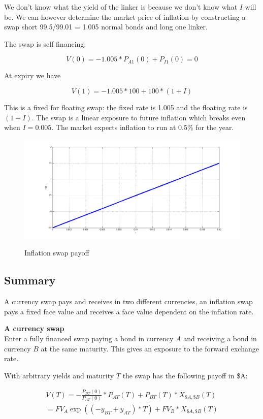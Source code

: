 We don't know what the yield of the linker is because we don't know what $I$ will be. We can however determine the market price of inflation by constructing a swap short 99.5/99.01 = 1.005 normal bonds and long one linker. 

The swap is self financing:

\[ V(0) = -1.005*P_{A1}(0) + P_{I1}(0) = 0\]

At expiry we have

\[ V(1) =  -1.005*100 + 100*(1+I)\]

This is a fixed for floating swap: the fixed rate is 1.005 and the floating rate is $(1+I)$. The swap is  a linear exposure to future inflation which breaks even when $I=0.005$. The market expects inflation to run at 0.5\% for the year. 

\begin{figure}[ht]
\centering
  \includegraphics[width=5in] {pics/inflation}
\label{fig:inflation}
\caption{Inflation swap payoff}
\end{figure}

\subsection{Summary}

A currency swap pays and receives in two different currencies, an inflation swap pays a fixed face value and receives a face value dependent on the inflation rate.

\textbf{A currency swap}\\
Enter a fully financed swap paying a bond in currency $A$ and receiving a bond in currency $B$ at the same maturity. This gives an exposure to the forward exchange rate.

With arbitrary yields and maturity $T$ the swap has the following payoff in \$A:

\begin{eqnarray*}
V(T) = -\frac{P_{BT}(0)}{P_{AT}(0)}*P_{AT}(T)+ P_{BT}(T)*X_{\$A,\$B}(T) \\
 =  FV_A\exp((-y_{BT}+y_{AT})*T)+ FV_B*X_{\$A,\$B}(T)  
 \end{eqnarray*}

